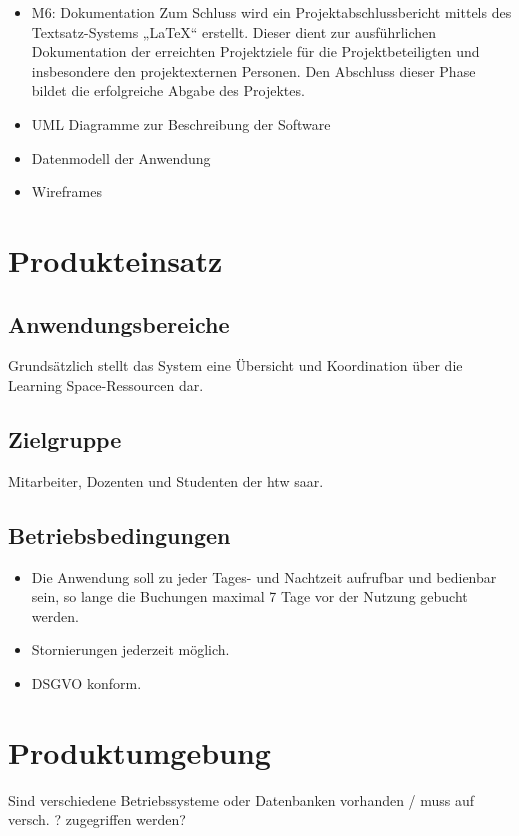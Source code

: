 \documentclass[a4paper,report,headsepline]{scrreprt}
\begin{document}
\begin{itemize}
\item M6: Dokumentation
Zum Schluss wird ein Projektabschlussbericht mittels des Textsatz-Systems „LaTeX“ erstellt. Dieser dient zur ausführlichen Dokumentation der erreichten Projektziele für die Projektbeteiligten und insbesondere den projektexternen Personen.  Den Abschluss dieser Phase bildet die erfolgreiche Abgabe des Projektes.



\item UML Diagramme zur Beschreibung der Software
\item Datenmodell der Anwendung

\item Wireframes

\end{itemize}

\chapter{Produkteinsatz}\label{produkteinsatz}

\section{Anwendungsbereiche}\label{anwendungsbereiche}
Grundsätzlich stellt das System eine Übersicht und Koordination über die Learning Space-Ressourcen dar.

\section{Zielgruppe}\label{zielgruppe}
Mitarbeiter, Dozenten und Studenten der htw saar.


\section{Betriebsbedingungen}\label{betriebsbedingungen}
\begin{itemize}
\item Die Anwendung soll zu jeder Tages- und Nachtzeit aufrufbar und bedienbar sein, so lange die Buchungen maximal 7 Tage vor der Nutzung gebucht werden.
\item Stornierungen jederzeit möglich.
\item DSGVO konform.
\end{itemize}


\chapter{Produktumgebung}\label{produktumgebung}
Sind verschiedene Betriebssysteme oder Datenbanken vorhanden / muss auf versch. ? zugegriffen werden?
\end{document}
